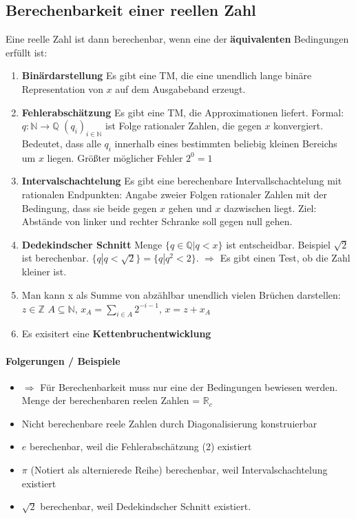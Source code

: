 \documentclass[ngerman]{scrartcl}
\begin{document}
\subsection{Berechenbarkeit einer reellen Zahl}
Eine reelle Zahl ist dann berechenbar, wenn eine der \textbf{äquivalenten} Bedingungen erfüllt ist:
\begin{enumerate}
  \item \textbf{Binärdarstellung} Es gibt eine TM, die eine unendlich lange binäre Representation von $ x $ auf dem Ausgabeband erzeugt.  
  \item \textbf{Fehlerabschätzung} Es gibt eine TM, die Approximationen liefert. Formal: $ q:\mathbb{N}\rightarrow \mathbb{Q} $ $ (q_{i})_{i \in \mathbb{N}} $ ist Folge rationaler Zahlen, die gegen $ x $ konvergiert. Bedeutet, dass alle $ q_i $ innerhalb eines bestimmten beliebig kleinen Bereichs um $ x $ liegen. Größter möglicher Fehler $ 2^0 = 1 $
  \item \textbf{Intervalschachtelung} Es gibt eine berechenbare Intervallschachtelung mit rationalen Endpunkten: Angabe zweier Folgen rationaler Zahlen mit der Bedingung, dass sie beide gegen $ x $ gehen und $ x $ dazwischen liegt. Ziel: Abstände von linker und rechter Schranke soll gegen null gehen.
  \item \textbf{Dedekindscher Schnitt} Menge $ \{q \in \mathbb{Q} | q < x \} $ ist entscheidbar. Beispiel $ \sqrt{2} $ ist berechenbar. $ \{ q | q < \sqrt{2} \} = \{ q | q^2 < 2\}$. $ \Rightarrow $ Es gibt einen Test, ob die Zahl kleiner ist.
  \item Man kann x als Summe von abzählbar unendlich vielen Brüchen darstellen: $ z \in \mathbb{Z} $ $ A \subseteq \mathbb{N} $, $ x_A = \sum_{i \in A} 2^{-i-1} $, $ x = z + x_A $
  \item Es exisitert eine \textbf{Kettenbruchentwicklung}
 \end{enumerate}
 \paragraph{Folgerungen / Beispiele}
\begin{itemize}
  \item $ \Rightarrow $ Für Berechenbarkeit muss nur eine der Bedingungen bewiesen werden. Menge der berechenbaren reelen Zahlen = $ \mathbb{R}_c $
  \item Nicht berechenbare reele Zahlen durch Diagonalisierung konstruierbar
  \item $ e $ berechenbar, weil die Fehlerabschätzung (2) existiert
  \item $ \pi $ (Notiert als alternierede Reihe) berechenbar, weil Intervalschachtelung existiert
  \item $ \sqrt{2} $ berechenbar, weil Dedekindscher Schnitt existiert.
 \end{itemize}
\end{document}
